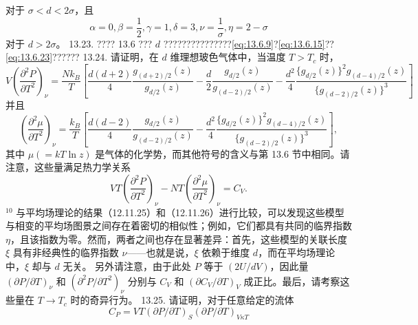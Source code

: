 对于 \(\sigma < d < 2\sigma\)，且
\begin{equation}\tag{13.7.48}\label{eq:13.7.48}
\alpha = 0 ,  \beta = \frac { 1 } { 2 } ,  \gamma = 1 ,  \delta = 3 ,  \nu = \frac { 1 } { \sigma } ,  \eta = 2 - \sigma
\end{equation}
对于 \(d > 2\sigma\)。
13.23. ???? 13.6 ??? \(d\) ???????????????\autoref{eq:13.6.9}?\autoref{eq:13.6.15}??\autoref{eq:13.6.23}??????
13.24. 请证明，在 \(d\) 维理想玻色气体中，当温度 \(T > T_c\) 时，
\begin{equation}\tag{13.7.49}\label{eq:13.7.49}
V \left( \frac { \partial ^{2} P } { \partial T ^{2} } \right) _ { \nu } = \frac { N k _ { B } } { T } \left[ \frac { d ( d + 2 ) } { 4 } \frac { g _ { ( d + 2 ) / 2 } ( z ) } { g _ { d / 2 } ( z ) } - \frac { d } { 2 } \frac { g _ { d / 2 } ( z ) } { g _ { ( d - 2 ) / 2 } ( z ) } - \frac { d ^{2} } { 4 } \frac { \{ g _ { d / 2 } ( z ) \} ^{2} g _ { ( d - 4 ) / 2 } ( z ) } { \{ g _ { ( d - 2 ) / 2 } ( z ) \} ^{3} } \right]
\end{equation}
并且
\begin{equation}\tag{13.7.50}\label{eq:13.7.50}
\left( \frac { \partial ^{2} \mu } { \partial T ^{2} } \right) _ { \nu } = \frac { k _ { B } } { T } \left[ \frac { d ( d - 2 ) } { 4 } \frac { g _ { d / 2 } ( z ) } { g _ { ( d - 2 ) / 2 } ( z ) } - \frac { d ^{2} } { 4 } \frac { \{ g _ { d / 2 } ( z ) \} ^{2} g _ { ( d - 4 ) / 2 } ( z ) } { \{ g _ { ( d - 2 ) / 2 } ( z ) \} ^{3} } \right] ,
\end{equation}
其中 \(\mu(=kT\ln z)\) 是气体的化学势，而其他符号的含义与第 13.6 节中相同。请注意，这些量满足热力学关系
\begin{equation}\tag{13.7.51}\label{eq:13.7.51}
V T \left( \frac { \partial ^{2} P } { \partial T ^{2} } \right) _ { \nu } - N T \left( \frac { \partial ^{2} \mu } { \partial T ^{2} } \right) _ { \nu } = C _ { V } .
\end{equation}
\(^{10}\) 与平均场理论的结果（12.11.25）和（12.11.26）进行比较，可以发现这些模型与相变的平均场图景之间存在着密切的相似性；例如，它们都具有共同的临界指数 \(\eta\)，且该指数为零。然而，两者之间也存在显著差异：首先，这些模型的关联长度 \(\xi\) 具有非经典性的临界指数 \(\nu\)——也就是说，\(\xi\) 依赖于维度 \(d\)，而在平均场理论中，\(\xi\) 却与 \(d\) 无关。
另外请注意，由于此处 \(P\) 等于 \((2U/dV)\)，因此量 \((\partial P/\partial T)_\nu\) 和 \((\partial^2 P/\partial T^2)_\nu\) 分别与 \(C_V\) 和 \((\partial C_V/\partial T)_V\) 成正比。最后，请考察这些量在 \(T \to T_c\) 时的奇异行为。
13.25. 请证明，对于任意给定的流体
\begin{equation}\tag{13.7.52}\label{eq:13.7.52}
C _ { P } = V T ( \partial P / \partial T ) _ { S } ( \partial P / \partial T ) _ { V \kappa T }
\end{equation}
